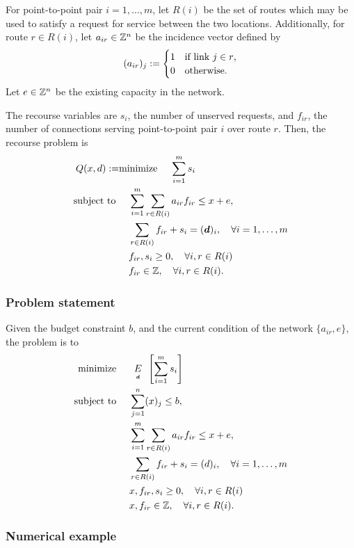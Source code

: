 For point-to-point pair $i=1, \ldots, m$, let $R(i)$ be the set of routes which may be used to satisfy a request for service between the two locations.  Additionally, for route $r \in R(i)$, let $a_{ir} \in {\mathbb Z}^n$ be the incidence vector defined by
\begin{equation*}
(a_{ir})_j :=
\begin{cases}
	1	&	\text{if link $j \in r$,}\\
	0	&	\text{otherwise.}
\end{cases}
\end{equation*}
Let $e \in {\mathbb Z}^n$ be the existing capacity in the network.

The recourse variables are $s_i$, the number of unserved requests, and $f_{ir}$, the number of connections serving point-to-point pair $i$ over route $r$.  Then, the recourse problem is
\begin{align*}
Q(x, d):= &\text{minimize } \quad \sum_{i=1}^m s_i\\
\text{subject to }& \quad \sum_{i=1}^m \sum_{r \in R(i)} a_{ir} f_{ir} \leq x + e,\\
&\quad \sum_{r \in R(i)} f_{ir} + s_i = (\mathbf{\boldsymbol{d}})_i,\quad \forall i=1,\ldots, m\\
&\quad f_{ir}, s_i \geq 0, \quad \forall i,r \in R(i)\\
&\quad f_{ir} \in {\mathbb Z}, \quad \forall i,r \in R(i).
\end{align*}

\subsubsection{Problem statement}
Given the budget constraint $b$, and the current condition of the network $\{ a_{ir}, e\}$, the problem is to
\begin{align*}
\text{minimize }&\quad \expect[d] \left[ \sum_{i=1}^m s_i\right]\\
\text{subject to }&\quad \sum_{j=1}^n (x)_j \leq b,\\
& \quad \sum_{i=1}^m \sum_{r \in R(i)} a_{ir} f_{ir} \leq x + e,\\
&\quad \sum_{r \in R(i)} f_{ir} + s_i = (d)_i,\quad \forall i=1, \ldots, m\\
&\quad x, f_{ir}, s_i \geq 0, \quad \forall i,r \in R(i)\\
&\quad x, f_{ir} \in \integers, \quad \forall i,r \in R(i).
\end{align*}


\subsubsection{Numerical example}

